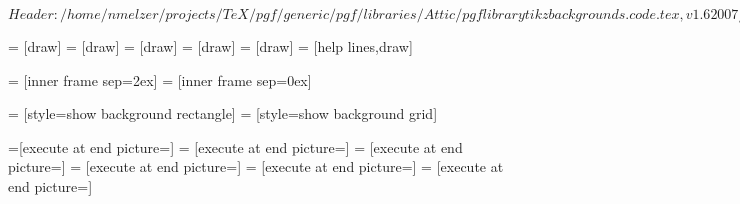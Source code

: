 %
%
%

\ProvidesFileRCS[v\pgfversion] $Header: /home/nmelzer/projects/TeX/pgf/generic/pgf/libraries/Attic/pgflibrarytikzbackgrounds.code.tex,v 1.6 2007/07/12 21:54:09 tantau Exp $






= [draw]
=       [draw]
=    [draw]
=      [draw]
=     [draw]
=      [help lines,draw]

\def\tikz@framexsep{1ex}
\def\tikz@frameysep{1ex}

\def\tikz@outerframexsep{0ex}
\def\tikz@outerframeysep{0ex}



=     [inner frame sep=2ex]
=     [inner frame sep=0ex]




=                   [style=show background rectangle]
=                  [style=show background grid]

=[execute at end picture=\tikz@background@framed]
=      [execute at end picture=\tikz@background@top]
=   [execute at end picture=\tikz@background@bottom]
=     [execute at end picture=\tikz@background@left]
=    [execute at end picture=\tikz@background@right]
=     [execute at end picture=\tikz@background@grid]


